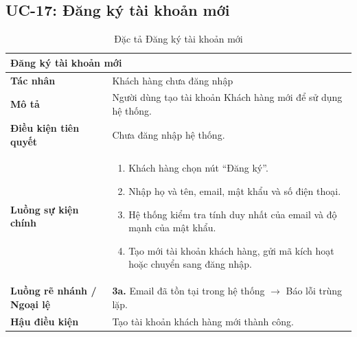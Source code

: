 \subsection{UC-17: Đăng ký tài khoản mới}
\begin{table}[H]
  \centering
  \begin{tabularx}{\textwidth}{|l|X|}
    \hline
    \multicolumn{2}{|l|}{\textbf{Đăng ký tài khoản mới}} \\
    \hline
    \textbf{Tác nhân}           & Khách hàng chưa đăng nhập \\ \hline
    \textbf{Mô tả}              & Người dùng tạo tài khoản Khách hàng mới để sử dụng hệ thống. \\ \hline
    \textbf{Điều kiện tiên quyết} & Chưa đăng nhập hệ thống. \\ \hline
    \textbf{Luồng sự kiện chính} &
      \begin{enumerate}[leftmargin=*, nosep, topsep=0pt]
        \item Khách hàng chọn nút ``Đăng ký''.
        \item Nhập họ và tên, email, mật khẩu và số điện thoại.
        \item Hệ thống kiểm tra tính duy nhất của email và độ mạnh của mật khẩu.
        \item Tạo mới tài khoản khách hàng, gửi mã kích hoạt hoặc chuyển sang đăng nhập.
      \end{enumerate} \\ \hline
    \textbf{Luồng rẽ nhánh / Ngoại lệ} &
      \textbf{3a.} Email đã tồn tại trong hệ thống $\rightarrow$ Báo lỗi trùng lặp. \\ \hline
    \textbf{Hậu điều kiện}      & Tạo tài khoản khách hàng mới thành công. \\
    \hline
  \end{tabularx}
  \caption{Đặc tả Đăng ký tài khoản mới}
  \label{tab:uc17}
\end{table}

